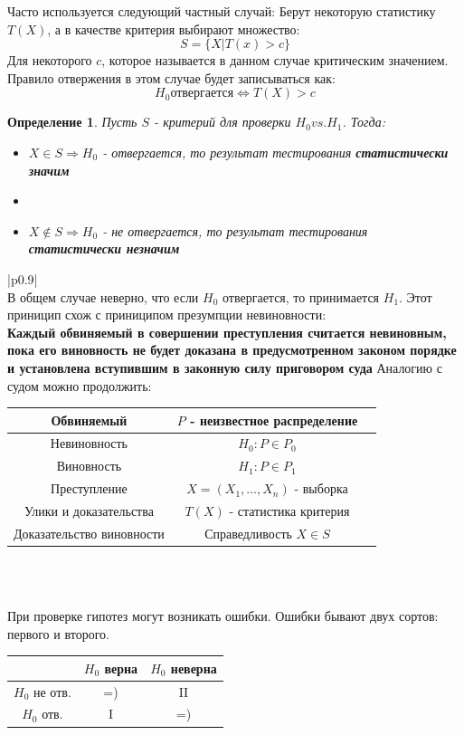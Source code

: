 \documentclass[a4paper,12pt]{article}
\newenvironment{annotation}{\begin{center}
    \begin{tabular}{|p{0.9\textwidth}|}
    \hline\\
}
{ 
    \\\\\hline
    \end{tabular} 
    \end{center}
}
\newtheorem{dfn}{Определение}[section]
\theoremstyle{named}
\begin{document}
Часто используется следующий частный случай: Берут некоторую статистику $T(X)$, а в качестве критерия выбирают множество:
$$
    S = \{ X | T(x) > c \}
$$
Для некоторого $c$, которое называется в данном случае критическим значением. Правило отвержения в этом случае будет записываться как:
$$
H_0 \text{отвергается} \Leftrightarrow T(X) > c
$$
\begin{dfn}
    Пусть $S$ - критерий для проверки $H_0 vs. H_1$. Тогда:
    \begin{itemize}
        \item $X \in S \Rightarrow H_0$ - отвергается, то результат тестирования \textbf{статистически значим}
        \item \item $X \not\in S \Rightarrow H_0$ - не отвергается, то результат тестирования \textbf{статистически незначим}
    \end{itemize}
\end{dfn}
\begin{annotation}
    В общем случае неверно, что если $H_0$ отвергается, то принимается $H_1$. Этот приницип схож с приниципом презумпции невиновности: \\
    \textbf{Каждый обвиняемый в совершении преступления считается невиновным, пока его виновность не будет доказана в предусмотренном законом порядке и установлена вступившим в законную силу приговором суда}
    Аналогию с судом можно продолжить:
    \begin{center}
    \begin{tabular}{ |c| c| c| }
        \hline
         Обвиняемый & $P$ - неизвестное распределение \\ 
         \hline
         Невиновность & $H_0 : P \in P_0$  \\  
        \hline         
         Виновность & $H_1: P \in P_1$ \\
         \hline    
         Преступление & $X = (X_1, ..., X_n)$ - выборка \\
         \hline
         Улики и доказательства & $T(X)$ - статистика критерия \\
         \hline 
         Доказательство виновности & Справедливость $X\in S$ \\
         \hline
    \end{tabular}
    \end{center}
\end{annotation}
При проверке гипотез могут возникать ошибки. Ошибки бывают двух сортов: первого и второго. 
\begin{center}
    \begin{tabular}{ |c| c| c| }
         \hline    
          & $H_0$ верна & $H_0$  неверна  \\
         \hline
         $H_0$ не отв. & =) &  II \\
         \hline 
         $H_0$ отв. & I  & =) \\
         \hline
    \end{tabular}
    \end{center}
\end{document}
